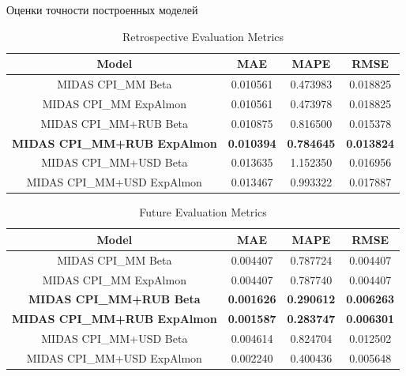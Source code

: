 \documentclass[notheorems, 10pt]{beamer}
\begin{document}
\begin{frame}
	{Оценки точности построенных моделей}
	\begin{table}[h]
		\centering
		\caption{Retrospective Evaluation Metrics}
		\label{tab:evaluation_metrics}
		\begin{tabular}{|c|c|c|c|}
			\hline
			Model & MAE & MAPE & RMSE \\
			\hline
			MIDAS CPI\_MM Beta          & 0.010561 & 0.473983 & 0.018825 \\
			MIDAS CPI\_MM ExpAlmon      & 0.010561 & 0.473978 & 0.018825 \\
			MIDAS CPI\_MM+RUB Beta      & 0.010875 & 0.816500 & 0.015378 \\
			\textbf{MIDAS CPI\_MM+RUB ExpAlmon}  & \textbf{0.010394} & \textbf{0.784645} & \textbf{0.013824} \\
			MIDAS CPI\_MM+USD Beta      & 0.013635 & 1.152350 & 0.016956 \\
			MIDAS CPI\_MM+USD ExpAlmon  & 0.013467 & 0.993322 & 0.017887 \\
			\hline
		\end{tabular}
	\end{table}
	
	\begin{table}[htbp]
		\centering
		\caption{Future Evaluation Metrics}
		\label{tab:evaluation_metrics}
		\begin{tabular}{|c|c|c|c|}
			\hline
			Model & MAE & MAPE & RMSE \\
			\hline
			MIDAS CPI\_MM Beta          & 0.004407 & 0.787724 & 0.004407 \\
			MIDAS CPI\_MM ExpAlmon      & 0.004407 & 0.787740 & 0.004407 \\
			\textbf{MIDAS CPI\_MM+RUB Beta}      & \textbf{0.001626} & \textbf{0.290612} & \textbf{0.006263} \\
			\textbf{MIDAS CPI\_MM+RUB ExpAlmon}  & \textbf{0.001587} & \textbf{0.283747} & \textbf{0.006301} \\
			MIDAS CPI\_MM+USD Beta      & 0.004614 & 0.824704 & 0.012502 \\
			MIDAS CPI\_MM+USD ExpAlmon  & 0.002240 & 0.400436 & 0.005648 \\
			\hline
		\end{tabular}
	\end{table}
\end{frame}

\end{document}
